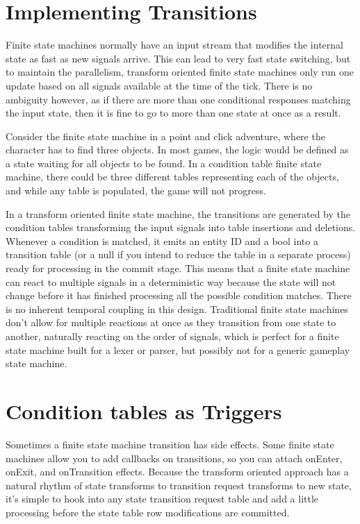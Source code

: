 \section{Implementing Transitions}

Finite state machines normally have an input stream that modifies the internal
state as fast as new signals arrive. This can lead to very fast state
switching, but to maintain the parallelism, transform oriented finite state
machines only run one update based on all signals available at the time of the
tick. There is no ambiguity however, as if there are more than one conditional
responses matching the input state, then it is fine to go to more than one
state at once as a result.

Consider the finite state machine in a point and click adventure, where the
character has to find three objects. In most games, the logic would be defined
as a state waiting for all objects to be found. In a condition table finite
state machine, there could be three different tables representing each of the
objects, and while any table is populated, the game will not progress.

In a transform oriented finite state machine, the transitions are generated by
the condition tables transforming the input signals into table insertions and
deletions. Whenever a condition is matched, it emits an entity ID and a bool
into a transition table (or a null if you intend to reduce the table in a
separate process) ready for processing in the commit stage. This means that a
finite state machine can react to multiple signals in a deterministic way
because the state will not change before it has finished processing all the
possible condition matches. There is no inherent temporal coupling in this
design. Traditional finite state machines don't allow for multiple reactions at
once as they transition from one state to another, naturally reacting on the
order of signals, which is perfect for a finite state machine built for a lexer
or parser, but possibly not for a generic gameplay state machine.

\section{Condition tables as Triggers}

Sometimes a finite state machine transition has side effects. Some finite state
machines allow you to add callbacks on transitions, so you can attach onEnter,
onExit, and onTransition effects. Because the transform oriented approach has a
natural rhythm of state transforms to transition request transforms to new
state, it's simple to hook into any state transition request table and add a
little processing before the state table row modifications are committed.

